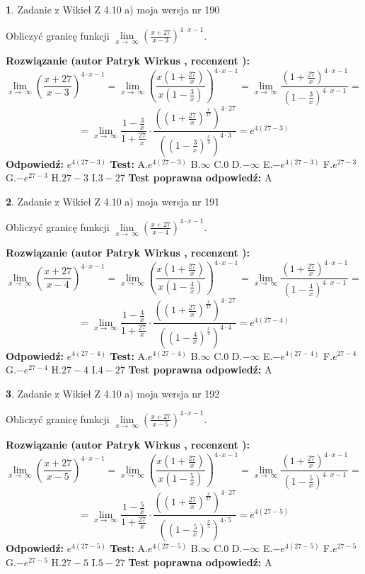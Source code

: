 \documentclass[12pt, a4paper]{article}
\theoremstyle{definition} %
\newtheorem{zad}{}
\newcommand{\zadStart}[1]{\begin{zad}#1\newline}
\newcommand{\zadStop}{\end{zad}}
\newcommand{\rozwStart}[2]{\noindent \textbf{Rozwiązanie (autor #1 , recenzent #2): }\newline}
\newcommand{\rozwStop}{\newline}
\newcommand{\odpStart}{\noindent \textbf{Odpowiedź:}\newline}
\newcommand{\odpStop}{\newline}
\newcommand{\testStart}{\noindent \textbf{Test:}\newline}
\newcommand{\testStop}{\newline}
\newcommand{\kluczStart}{\noindent \textbf{Test poprawna odpowiedź:}\newline}
\newcommand{\kluczStop}{\newline}
\begin{document}
\zadStart{Zadanie z Wikieł Z 4.10 a) moja wersja nr 190}


Obliczyć granicę funkcji  $\lim\limits_{x\to\ \infty}(\frac{x+27}{x-3})^{4\cdot x-1}$.
\zadStop
\rozwStart{Patryk Wirkus}{}
$$\lim\limits_{x\to\ \infty}(\frac{x+27}{x-3})^{4\cdot x-1} = \lim\limits_{x\to\ \infty}(\frac{x(1+\frac{27}{x})}{x(1-\frac{3}{x})})^{4\cdot x-1}=\lim\limits_{x\to\ \infty}\frac{(1+\frac{27}{x})^{4\cdot x-1}}{(1-\frac{3}{x})^{4\cdot x-1}}=$$
$$=\lim\limits_{x\to\ \infty}\frac{1-\frac{3}{x}}{1+\frac{27}{x}}\cdot\frac{((1+\frac{27}{x})^{\frac{x}{27}})^{4\cdot27}}{((1-\frac{3}{x})^{\frac{x}{3}})^{4\cdot3}}=e^{4(27-3)}$$
\rozwStop
\odpStart
$e^{4(27-3)}$
\odpStop
\testStart
A.$e^{4(27-3)}$ B.$\infty$ C.$0$ D.$-\infty$ E.$-e^{4(27-3)}$
F.$e^{27-3}$ G.$-e^{27-3}$
H.$27-3$
I.$3-27$
\testStop
\kluczStart
A
\kluczStop



\zadStart{Zadanie z Wikieł Z 4.10 a) moja wersja nr 191}


Obliczyć granicę funkcji  $\lim\limits_{x\to\ \infty}(\frac{x+27}{x-4})^{4\cdot x-1}$.
\zadStop
\rozwStart{Patryk Wirkus}{}
$$\lim\limits_{x\to\ \infty}(\frac{x+27}{x-4})^{4\cdot x-1} = \lim\limits_{x\to\ \infty}(\frac{x(1+\frac{27}{x})}{x(1-\frac{4}{x})})^{4\cdot x-1}=\lim\limits_{x\to\ \infty}\frac{(1+\frac{27}{x})^{4\cdot x-1}}{(1-\frac{4}{x})^{4\cdot x-1}}=$$
$$=\lim\limits_{x\to\ \infty}\frac{1-\frac{4}{x}}{1+\frac{27}{x}}\cdot\frac{((1+\frac{27}{x})^{\frac{x}{27}})^{4\cdot27}}{((1-\frac{4}{x})^{\frac{x}{4}})^{4\cdot4}}=e^{4(27-4)}$$
\rozwStop
\odpStart
$e^{4(27-4)}$
\odpStop
\testStart
A.$e^{4(27-4)}$ B.$\infty$ C.$0$ D.$-\infty$ E.$-e^{4(27-4)}$
F.$e^{27-4}$ G.$-e^{27-4}$
H.$27-4$
I.$4-27$
\testStop
\kluczStart
A
\kluczStop



\zadStart{Zadanie z Wikieł Z 4.10 a) moja wersja nr 192}


Obliczyć granicę funkcji  $\lim\limits_{x\to\ \infty}(\frac{x+27}{x-5})^{4\cdot x-1}$.
\zadStop
\rozwStart{Patryk Wirkus}{}
$$\lim\limits_{x\to\ \infty}(\frac{x+27}{x-5})^{4\cdot x-1} = \lim\limits_{x\to\ \infty}(\frac{x(1+\frac{27}{x})}{x(1-\frac{5}{x})})^{4\cdot x-1}=\lim\limits_{x\to\ \infty}\frac{(1+\frac{27}{x})^{4\cdot x-1}}{(1-\frac{5}{x})^{4\cdot x-1}}=$$
$$=\lim\limits_{x\to\ \infty}\frac{1-\frac{5}{x}}{1+\frac{27}{x}}\cdot\frac{((1+\frac{27}{x})^{\frac{x}{27}})^{4\cdot27}}{((1-\frac{5}{x})^{\frac{x}{5}})^{4\cdot5}}=e^{4(27-5)}$$
\rozwStop
\odpStart
$e^{4(27-5)}$
\odpStop
\testStart
A.$e^{4(27-5)}$ B.$\infty$ C.$0$ D.$-\infty$ E.$-e^{4(27-5)}$
F.$e^{27-5}$ G.$-e^{27-5}$
H.$27-5$
I.$5-27$
\testStop
\kluczStart
A
\kluczStop
\end{document}
